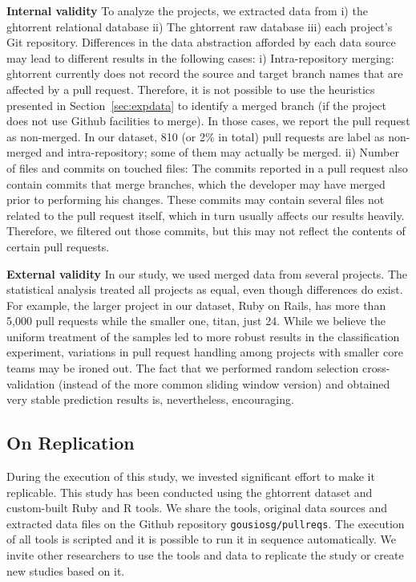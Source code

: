 \documentclass{acm_proc_article-sp}
\begin{document}
\textbf{Internal validity}
To analyze the projects, we extracted data from i) the {\sc ght}orrent relational
database ii) The {\sc ght}orrent raw database iii) each project's Git repository.
Differences in the data abstraction afforded by each data source may
lead to different results in the following cases: 
i) Intra-repository merging: {\sc ght}orrent currently does not record the source
    and target branch names that are affected by a pull request. Therefore, it
    is not possible to use the heuristics presented in
    Section~\ref{sec:expdata} to identify a merged branch (if the project
    does not use Github facilities to merge). In those cases, we
    report the pull request as non-merged. In our dataset, 810 (or 2\% in total)
    pull requests are label as non-merged and intra-repository; some of them may
    actually be merged.
ii) Number of files and commits on touched files: The commits reported
    in a pull request also contain commits that merge branches, which the
    developer may have merged prior to performing his changes. These commits
    may contain several files not related to the pull request itself, which
    in turn usually affects our results heavily. Therefore, we  
    filtered out those commits, but this may not reflect the contents of 
    certain pull requests.

\textbf{External validity}
In our study, we used merged data from several projects. The statistical
analysis treated all projects as equal, even though differences do exist.
For example, the larger project in our dataset, Ruby on Rails, 
has more than 5,000 pull requests while the smaller one, \textsf{titan}, just 24.
While we believe the uniform treatment of the samples led to more robust
results in the classification experiment, variations in pull request
handling among projects with smaller core teams may be ironed out.
The fact that we performed random selection cross-validation (instead
of the more common sliding window version) and obtained very stable prediction
results is, nevertheless, encouraging.

\subsection{On Replication}
During the execution of this study, we invested significant effort to make it
replicable. This study has been conducted using the {\sc ght}orrent dataset and
custom-built Ruby and R tools. We share the tools, original data sources and
extracted data files on the Github repository \texttt{gousiosg/pullreqs}.  The
execution of all tools is scripted and it is possible to run it in sequence
automatically. We invite other researchers to use the tools and data to
replicate the study or create new studies based on it.
\end{document}

